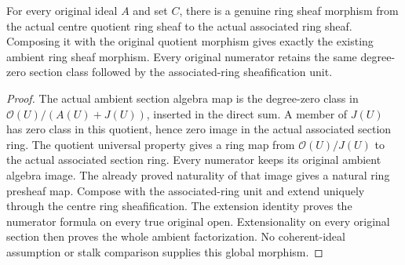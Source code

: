 \begin{theorem}
\label{hir:real-domain-actual-centre-ring-sheaf-associated-map}
\leanok
For every original ideal $A$ and set $C$, there is a genuine ring sheaf
morphism from the actual centre quotient ring sheaf to the actual
associated ring sheaf. Composing it with the original quotient morphism
gives exactly the existing ambient ring sheaf morphism. Every original
numerator retains the same degree-zero section class followed by the
associated-ring sheafification unit.
\end{theorem}
\begin{proof}
The actual ambient section algebra map is the degree-zero class in
$\mathcal O(U)/(A(U)+J(U))$, inserted in the direct sum. A member of
$J(U)$ has zero class in this quotient, hence zero image in the actual
associated section ring. The quotient universal property gives a ring
map from $\mathcal O(U)/J(U)$ to the actual associated section ring.
Every numerator keeps its original ambient algebra image. The already
proved naturality of that image gives a natural ring presheaf map.
Compose with the associated-ring unit and extend uniquely through the
centre ring sheafification. The extension identity proves the numerator
formula on every true original open. Extensionality on every original
section then proves the whole ambient factorization. No coherent-ideal
assumption or stalk comparison supplies this global morphism.
\end{proof}


